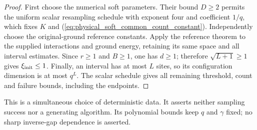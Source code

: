 \begin{proof}\leanok
    First choose the numerical soft parameters. Their bound $D\ge2$
    permits the uniform scalar resampling schedule with exponent four
    and coefficient $1/q$, which fixes $K$ and
    (\ref{eq:physical_soft_common_count_constant}). Independently choose
    the original-ground reference constants. Apply the reference theorem
    to the supplied interactions and ground energy, retaining its same
    space and all interval estimates. Since $r\ge1$ and $B\ge1$, one has
    $d\ge1$; therefore $\sqrt{L+1}\ge1$ gives $\xi_{\rm init}\le1$.
    Finally, an interval has at most $L$ sites, so its configuration
    dimension is at most $q^L$. The scalar schedule gives all remaining
    threshold, count and failure bounds, including the endpoints.
\end{proof}

This is a simultaneous choice of deterministic data. It asserts neither
sampling success nor a generating algorithm. Its polynomial bounds keep
$q$ and $\gamma$ fixed; no sharp inverse-gap dependence is asserted.
